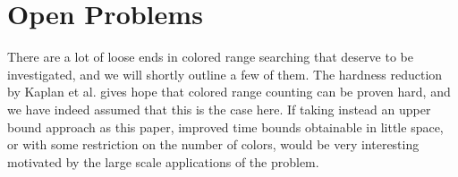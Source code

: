 \section{Open Problems}
There are a lot of loose ends in colored range searching that deserve to be investigated, and we will shortly outline a few of them. The hardness reduction by Kaplan et al. \cite{kaplan2007counting} gives hope that colored range counting can be proven hard, and we have indeed assumed that this is the case here. If taking instead an upper bound approach as this paper, improved time bounds obtainable in little space, or with some restriction on the number of colors, would be very interesting motivated by the large scale applications of the problem.







